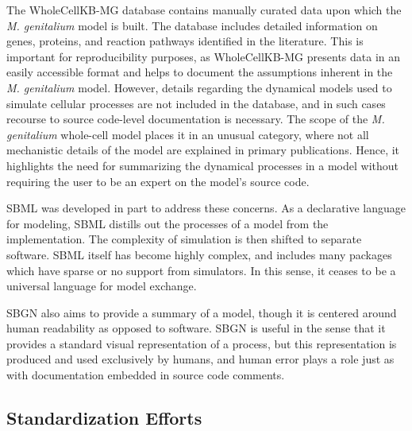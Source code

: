 \documentclass[journal,transmag,twoside]{IEEEtran}
\begin{document}
The WholeCellKB-MG database \cite{karr2013wholecellkb} contains manually curated data upon which the
\textit{M. genitalium} model is built. The database includes detailed
information on genes, proteins, and reaction pathways identified in the literature.
This is important for reproducibility purposes, as WholeCellKB-MG presents
data in an easily accessible format and helps to document the assumptions
inherent in the \textit{M. genitalium} model.
However, details regarding the dynamical models used to simulate cellular
processes are not included in the database, and in such cases recourse to
source code-level documentation is necessary.
The scope of the \textit{M. genitalium} whole-cell model places it in an
unusual category, where not all mechanistic details of the model are explained in primary
publications. Hence, it highlights the need for summarizing the
dynamical processes in a model without requiring the user to be an expert on the model's
source code.

SBML was developed in part to address these concerns. As a declarative language
for modeling, SBML distills out the processes of a model from the implementation.
The complexity of simulation is then shifted to separate software.
SBML itself has become highly complex, and includes many packages which
have sparse or no support from simulators.
In this sense, it ceases to be a universal language for model exchange.

SBGN also aims to provide a summary of a model, though it is centered
around human readability as opposed to software.
SBGN is useful in the sense that it provides a standard visual representation
of a process, but this representation is produced and used exclusively by humans,
and human error plays a role just as with documentation embedded in source code comments.

\subsection{Standardization Efforts}

%
%
\end{document}
